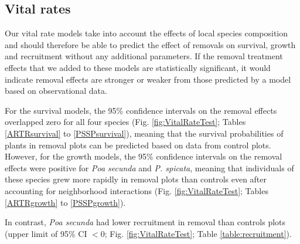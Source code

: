 \documentclass[11pt]{article}
\begin{document}
\begin{doublespacing}
\subsection*{Vital rates}

Our vital rate models take into account the effects of local species composition and should therefore be able to predict the effect of removals on survival, growth and recruitment without any additional parameters. If the removal treatment effects that we added to these models are statistically significant, it would indicate removal effects are stronger or weaker from those predicted by a model based on observational data. 


For the survival models, the 95\% confidence intervals on the removal effects overlapped zero for all four species (Fig. \ref{fig:VitalRateTest}; Tables \ref{ARTRsurvival} to \ref{PSSPsurvival}), meaning that the survival probabilities of plants in removal plots can be predicted based on data from control plots. However, for the growth models, the 95\% confidence intervals on the removal effects were positive for \textit{Poa secunda}  and \textit{P. spicata}, meaning that individuals of these species grew more rapidly in removal plots than controls even after accounting for neighborhood interactions (Fig. \ref{fig:VitalRateTest}; Tables \ref{ARTRgrowth} to \ref{PSSPgrowth}). 


In contrast, \textit{Poa secunda} had lower recruitment in removal than controls plots (upper limit of 95\% CI $<0$; Fig. \ref{fig:VitalRateTest}; Table \ref{table:recruitment}).



\end{doublespacing}
\end{document}
